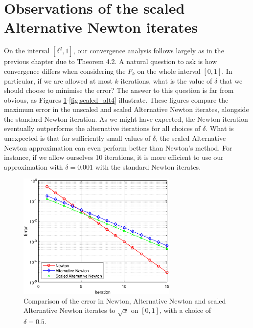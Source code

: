 \section{Observations of the scaled Alternative Newton iterates}

On the interval $[\delta^2,1]$, our convergence analysis follows largely as in the previous chapter due to Theorem 4.2. A natural question to ask is how convergence differs when considering the $F_k$ on the whole interval $[0,1]$. In particular, if we are allowed at most $k$ iterations, what is the value of $\delta$ that we should choose to minimise the error? The answer to this question is far from obvious, as Figures \ref{fig:scaled_alt1}-\ref{fig:scaled_alt4} illustrate. These figures compare the maximum error in the unscaled and scaled Alternative Newton iterates, alongside the standard Newton iteration. As we might have expected, the Newton iteration eventually outperforms the alternative iterations for all choices of $\delta$. What is unexpected is that for sufficiently small values of $\delta$, the scaled Alternative Newton approximation can even perform better than Newton's method. For instance, if we allow ourselves 10 iterations, it is more efficient to use our approximation with $\delta=0.001$ with the standard Newton iterates.

\begin{figure}[t!]
\centering
   \includegraphics[width=0.7\textwidth,height=0.7\textheight,keepaspectratio]{figures/chapter_4/AN_vs_SAN_0p5.eps}
   \caption{Comparison of the error in Newton, Alternative Newton and scaled Alternative Newton iterates to $\sqrt{x}$ on $[0,1]$, with a choice of $\delta=0.5$.}
   \label{fig:scaled_alt1}
\end{figure}

